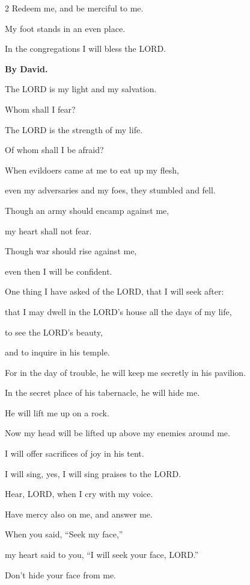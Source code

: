 \begin{multicols}{2}
	Redeem me, and be merciful to me.
	
	
	\myverse{}My foot stands in an even place.
	
	In the congregations I will bless the LORD.
	
	
	\mychapter{}\textbf{By David.}
	
	\quad \myverse*{}The LORD is my light and my salvation.
	
	Whom shall I fear?
	
	The LORD is the strength of my life.
	
	Of whom shall I be afraid?
	
	
	\myverse{}When evildoers came at me to eat up my flesh,
	
	even my adversaries and my foes, they stumbled and fell.
	
	
	\myverse{}Though an army should encamp against me,
	
	my heart shall not fear.
	
	Though war should rise against me,
	
	even then I will be confident.
	
	
	\myverse{}One thing I have asked of the LORD, that I will seek after:
	
	that I may dwell in the LORD’s house all the days of my life,
	
	to see the LORD’s beauty,
	
	and to inquire in his temple.
	
	
	\myverse{}For in the day of trouble, he will keep me secretly in his pavilion.
	
	In the secret place of his tabernacle, he will hide me.
	
	He will lift me up on a rock.
	
	
	\myverse{}Now my head will be lifted up above my enemies around me.
	
	I will offer sacrifices of joy in his tent.
	
	I will sing, yes, I will sing praises to the LORD.
	
	\vspace{\baselineskip}
	
	\myverse{}Hear, LORD, when I cry with my voice.
	
	Have mercy also on me, and answer me.
	
	
	\myverse{}When you said, “Seek my face,”
	
	my heart said to you, “I will seek your face, LORD.”
	
	
	\myverse{}Don’t hide your face from me.
	

\end{multicols}
